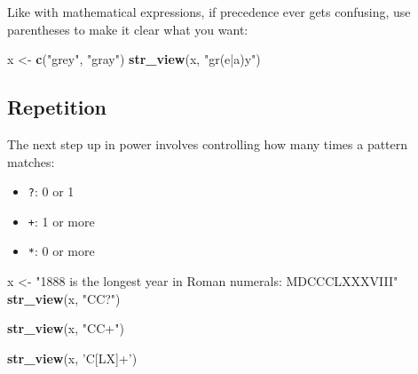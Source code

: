 \documentclass[]{book}
\newenvironment{Shaded}{\begin{snugshade}}{\end{snugshade}}
\newcommand{\KeywordTok}[1]{\textcolor[rgb]{0.13,0.29,0.53}{\textbf{#1}}}
\newcommand{\StringTok}[1]{\textcolor[rgb]{0.31,0.60,0.02}{#1}}
\newcommand{\NormalTok}[1]{#1}
\providecommand{\tightlist}{%
  \setlength{\itemsep}{0pt}\setlength{\parskip}{0pt}}
\begin{document}
Like with mathematical expressions, if precedence ever gets confusing,
use parentheses to make it clear what you want:

\begin{Shaded}
\begin{Highlighting}[]
\NormalTok{x <-}\StringTok{ }\KeywordTok{c}\NormalTok{(}\StringTok{"grey"}\NormalTok{, }\StringTok{"gray"}\NormalTok{)}
\KeywordTok{str_view}\NormalTok{(x, }\StringTok{"gr(e|a)y"}\NormalTok{)}
\end{Highlighting}
\end{Shaded}

\hypertarget{htmlwidget-3f27c09be0c60bb52829}{}

\subsection{Repetition}\label{repetition}

The next step up in power involves controlling how many times a pattern
matches:

\begin{itemize}
\tightlist
\item
  \texttt{?}: 0 or 1
\item
  \texttt{+}: 1 or more
\item
  \texttt{*}: 0 or more
\end{itemize}

\begin{Shaded}
\begin{Highlighting}[]
\NormalTok{x <-}\StringTok{ "1888 is the longest year in Roman numerals: MDCCCLXXXVIII"}
\KeywordTok{str_view}\NormalTok{(x, }\StringTok{"CC?"}\NormalTok{)}
\end{Highlighting}
\end{Shaded}

\hypertarget{htmlwidget-416566eb193bf50d04e6}{}

\begin{Shaded}
\begin{Highlighting}[]
\KeywordTok{str_view}\NormalTok{(x, }\StringTok{"CC+"}\NormalTok{)}
\end{Highlighting}
\end{Shaded}

\hypertarget{htmlwidget-72cbf064100ce560a04c}{}

\begin{Shaded}
\begin{Highlighting}[]
\KeywordTok{str_view}\NormalTok{(x, }\StringTok{'C[LX]+'}\NormalTok{)}
\end{Highlighting}
\end{Shaded}
\end{document}
